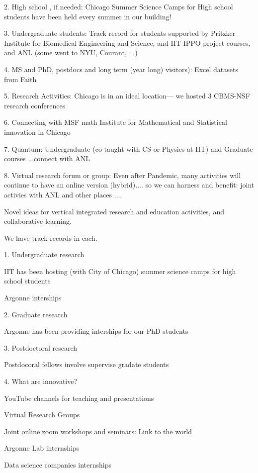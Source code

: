 \documentclass[11pt]{article}
\begin{document}
2. High school , if needed:   Chicago Summer Science Camps for High school students  have been held every summer in our building!

3.  Undergraduate students: Track record for students supported by Pritzker Institute for Biomedical Engineering and Science, and IIT IPPO project courses, and ANL  (some went to NYU, Courant, ...)

4. MS and PhD, postdocs and long term (year long) visitors): Excel datasets from Faith

5.  Research Activities: Chicago is in an ideal location--- we hosted 3 CBMS-NSF research conferences

6. Connecting with MSF math Institute for Mathematical and Statistical innovation in Chicago

7. Quantum: Undergraduate (co-taught with CS or Physics at IIT) and Graduate courses ...connect with ANL

8. Virtual research forum or group: Even after Pandemic, many activities will continue to have an online version (hybrid).... so we can harness and benefit: joint activies with ANL and other places .... 
 
 




Novel ideas for vertical integrated research and education activities, and collaborative learning.

We have    track records in each.


1. Undergraduate research 

IIT has been hosting (with City of Chicago) summer science camps for high school students

Argonne interships


2. Graduate research 


Argonne has been providing interships for our PhD students 


3. Postdoctoral research

Postdocoral fellows involve  supervise gradate students 


4. What are innovative?

YouTube channels for teaching and presentations

Virtual Research Groups

Joint online zoom workshops and seminars: Link to the  world 



Argonne Lab internships

Data science companies internships 
\end{document}
